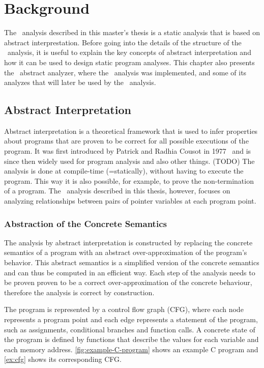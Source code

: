 \chapter{Background}\label{chapter:background}

The \cpo\ analysis described in this master's thesis is a static analysis that is based on abstract interprestation.
Before going into the details of the structure of the \cpo\ analysis,
it is useful to explain the key concepts of abstract interpretation and how it can be used
to design static program analyses.
This chapter also presents the \goblint\ abstract analyzer, where the \cpo\ analysis was implemented, and some of its analyzes that will later be
used by the \cpo\ analysis.

\section{Abstract Interpretation}

Abstract interpretation is a theoretical framework that is used to infer properties about programs
that are proven to be correct for all possible executions of the program.
It was first introduced by Patrick and Radhia Cousot in 1977~\cite{TODO} and is since then widely used
for program analysis and also other things. (TODO)
The analysis is done at compile-time (=statically), without having to execute the program.
This way it is also possible, for example, to prove the non-termination of a program.
The \cpo\ analysis described in this thesis, however, focuses on analyzing
relationships between pairs of pointer variables at each program point.

\subsection{Abstraction of the Concrete Semantics}

The analysis by abstract interpretation is constructed by replacing the concrete
semantics of a program with an abstract over-approximation of the program's behavior.
This abstract semantics is a simplified version of the concrete semantics
and can thus be computed in an efficient way.
Each step of the analysis needs to be proven proven to be a correct over-approximation of the concrete behaviour,
therefore the analysis is correct by construction.

The program is represented by a control flow graph (CFG), where each node represents a program point and each edge represents a statement of the program, such as assignments, conditional branches and function calls.
A concrete state of the program is defined by functions that describe the values for each variable and each memory address.
\cref{fig:example-C-program} shows an example C program and \cref{ex:cfg} shows its corresponding CFG.

